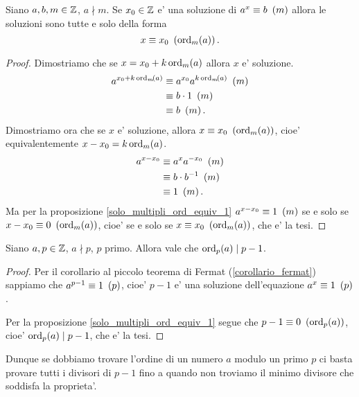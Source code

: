 \begin{proposition}
    Siano $a, b, m \in \Z$, $a \nmid m$. Se $x_0 \in \Z$ e' una soluzione di $a^x \equiv b \Mod{m}$ allora le soluzioni sono tutte e solo della forma \begin{equation}
        x \equiv x_0 \Mod{\ord{a}{m}}.
    \end{equation}
\end{proposition}
\begin{proof}
    Dimostriamo che se $x = x_0 + k\ord{a}{m}$ allora $x$ e' soluzione.
    \begin{alignat*}
        {1}
        a^{x_0 + k\ord{a}{m}} &\equiv a^{x_0}a^{k\ord{a}{m}} \Mod{m} \\
        &\equiv b \cdot 1 \Mod{m} \\
        &\equiv b \Mod{m}.
    \end{alignat*}
    Dimostriamo ora che se $x$ e' soluzione, allora $x \equiv x_0 \Mod{\ord{a}{m}}$, cioe' equivalentemente $x - x_0 = k\ord{a}{m}$.
    \begin{alignat*}
        {1}
        a^{x - x_0} &\equiv a^{x}a^{-x_0} \Mod{m} \\
        &\equiv b \cdot b^{-1} \Mod{m} \\
        &\equiv 1 \Mod{m}.
    \end{alignat*}
    Ma per la proposizione \ref{solo_multipli_ord_equiv_1} $a^{x - x_0} \equiv 1 \Mod{m}$ se e solo se $x - x_0 \equiv 0 \Mod{\ord{a}{m}}$, cioe' se e solo se $x \equiv x_0 \Mod{\ord{a}{m}}$, che e' la tesi.
\end{proof}

\begin{proposition}
    Siano $a, p \in \Z$, $a \nmid p$, $p$ primo. Allora vale che $\ord{a}{p} \divides p-1$.
\end{proposition}
\begin{proof}
    Per il corollario al piccolo teorema di Fermat (\ref{corollario_fermat}) sappiamo che $a^{p-1} \equiv 1 \Mod{p}$, cioe' $p-1$ e' una soluzione dell'equazione $a^x \equiv 1 \Mod{p}$. 
    
    Per la proposizione \ref{solo_multipli_ord_equiv_1} segue che $p-1 \equiv 0 \Mod{\ord{a}{p}}$, cioe' $\ord{a}{p} \mid p-1$, che e' la tesi.
\end{proof}

Dunque se dobbiamo trovare l'ordine di un numero $a$ modulo un primo $p$ ci basta provare tutti i divisori di $p - 1$ fino a quando non troviamo il minimo divisore che soddisfa la proprieta'.
